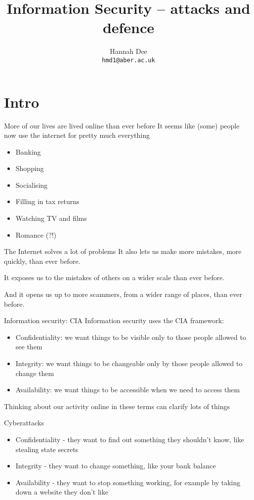 \documentclass[xcolor=table]{beamer}
\title{Information Security -- attacks and defence}
\author[hmd1]{Hannah Dee \\
  \texttt{hmd1@aber.ac.uk}}
\date{}
\institute[]{U3A Aberystwyth, April 2023\\
  Aberystwyth University, Department of Computer Science}
\begin{document}
\begin{frame}
  \titlepage
\end{frame}


\section{Intro}

\begin{frame}{More of our lives are lived online than ever
	before}
	It seems like (some) people now use the internet for pretty much everything
	\begin{itemize}
		\item Banking
		\item Shopping
		\item Socialising 
		\item Filling in tax returns
		\item Watching TV and films 
		\item Romance (?!) 
	\end{itemize}
\end{frame}
\begin{frame}{The Internet solves a lot of problems}
	It also lets us make more mistakes, more quickly, than ever before.

	\vspace{0.5em}

	It exposes us to the mistakes of others on a wider scale than ever before.

	\vspace{0.5em}

	And it opens us up to more scammers, from a wider range of places, than ever before.
\end{frame}
\begin{frame}{Information security: CIA}
	Information security uses the CIA framework:
	\begin{itemize}
		\item Confidentiality: we want things to be visible only to those people allowed to see them
		\item Integrity: we want things to be changeable only by those people allowed to change them 
		\item Availability: we want things to be accessible when we need to access them
	\end{itemize}
	Thinking about our activity online in these terms can clarify lots of things
\end{frame}
\begin{frame}{Cyberattacks}
	\begin{itemize}
		\item Confidentiality - they want to find out something they shouldn't know, like stealing state secrets
		\item Integrity - they want to change something, like your bank balance
		\item Availability - they want to stop something working, for example by taking down a website they don't like
	\end{itemize}
\end{frame}
\end{document}
